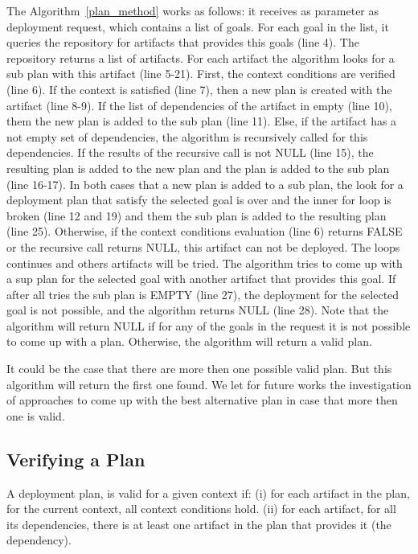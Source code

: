 The Algorithm~\ref{plan_method} works as follows: it receives as parameter as deployment request, which contains a list of goals. For each goal in the list, it queries the repository for artifacts that provides this goals (line 4). The repository returns a list of artifacts. For each artifact the algorithm looks for a sub plan with this artifact (line 5-21). First, the context conditions are verified (line 6). If the context is satisfied (line 7),
then a new plan is created with the artifact (line 8-9). If the list of dependencies of the artifact in empty (line 10), them the new plan is added to the sub plan (line 11). Else, if the artifact has a not empty set of dependencies, the algorithm is recursively called for this dependencies. If the results of the recursive call is not NULL (line 15), the resulting plan is added to the new plan and the plan is added to the sub plan (line 16-17).
In both cases that a new plan is added to a sub plan, the look for a deployment plan that satisfy the selected goal is over and the inner for loop is broken (line 12 and 19) and them the sub plan is added to the resulting plan (line 25).
Otherwise, if the context conditions evaluation (line 6) returns FALSE or the recursive call returns NULL, this artifact can not be deployed. The loops continues and others artifacts will be tried. The algorithm tries to come up with a sup plan for the selected goal with another artifact that provides this goal. If after all tries the sub plan is EMPTY (line 27), the deployment for the selected goal is not possible, and the algorithm returns NULL (line 28). Note that the algorithm will return NULL if for any of the goals in the request it is not possible to come up with a plan. Otherwise, the algorithm will return a valid plan.

It could be the case that there are more then one possible valid plan. But this algorithm will return the first one found.  We let for future works the investigation of approaches to come up with the best alternative plan in case that more then one is valid.

\subsection{Verifying a Plan}
\label{verify_plan}

A deployment plan, is valid for a given context if: (i) for each artifact in the plan, for the current context, all context conditions hold.
(ii) for each artifact, for all its dependencies, there is at least one artifact in the plan that provides it (the dependency).


